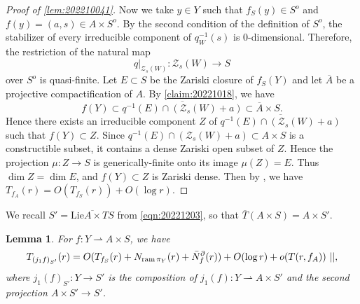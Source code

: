 \documentclass[11pt,english]{smfart}
\theoremstyle{plain}
\newtheorem{lem}[thm]{Lemma}
\theoremstyle{definition}
\theoremstyle{remark}
\numberwithin{equation}{section}
\theoremstyle{plain}
\newcommand{\da}{\rightharpoonup}
\newcommand{\pN}[1]{\bar{N}_{#1}^{\partial}}
\newcommand{\ram}{{\rm ram}\,}
\begin{document}
\begin{proof}[Proof of \cref{lem:202210041}]
		Now we take $y\in Y$ such that $f_S(y)\in S^o$ and $f(y)=(a,s)\in A\times S^o$.
		By the second condition of the definition of $S^o$, the stabilizer of every irreducible component of $q_W^{-1}(s)$ is 0-dimensional.
		Therefore, the restriction of the natural map 
		$$q|_{\mathcal{Z}_s(W)} :\mathcal{Z}_s(W)\to S$$ 
		over $S^o$ is quasi-finite.
		Let $E\subset S$ be the Zariski closure of $f_S(Y)$ and let $\overline{A}$ be a projective compactification of $A$.
		By \cref{claim:20221018}, we have 
		$$f(Y)\subset \overline{q^{-1}(E)\cap(\mathcal{Z}_s(W)+a)}\subset \overline{A}\times S.$$
		Hence there exists an irreducible component $Z$ of $\overline{q^{-1}(E)\cap(\mathcal{Z}_s(W)+a)}$ such that $f(Y)\subset Z$.
		Since $q^{-1}(E)\cap (\mathcal{Z}_s(W)+a)\subset A\times S$ is a constructible subset, it contains a dense Zariski open subset of $Z$.
		Hence the projection $\mu:Z\to S$ is generically-finite onto its image $\mu(Z)=E$.
		Thus $\dim Z=\dim E$, and $f(Y)\subset Z$ is Zariski dense.
		Then by \cite[Lemma 4]{Yam15}, we have $T_{f_A}(r)=O(T_{f_S}(r))+O(\log r)$.
	\end{proof}
	
	
	
	
	
	
	We recall $S'=\overline{\mathrm{Lie}A\times TS}$ from \eqref{eqn:20221203}, so that $\overline{T}(A\times S)=A\times S'$.
	
	\begin{lem}\label{lem:202210042}
		For $f:Y\da A\times S$, we have
		$$T_{(j_1f)_{S'}}(r)=O( T_{f_S}(r)+N_{\ram \pi _Y}(r)+\pN{f}(r))+O(\log r)+o(T(r,f_A)) \ ||,$$
		where $j_1(f)_{S'}:Y\to S'$ is the composition of $j_1(f):Y\da A\times S'$ and the second projection $A\times S'\to S'$.
	\end{lem}
	
\end{document}
